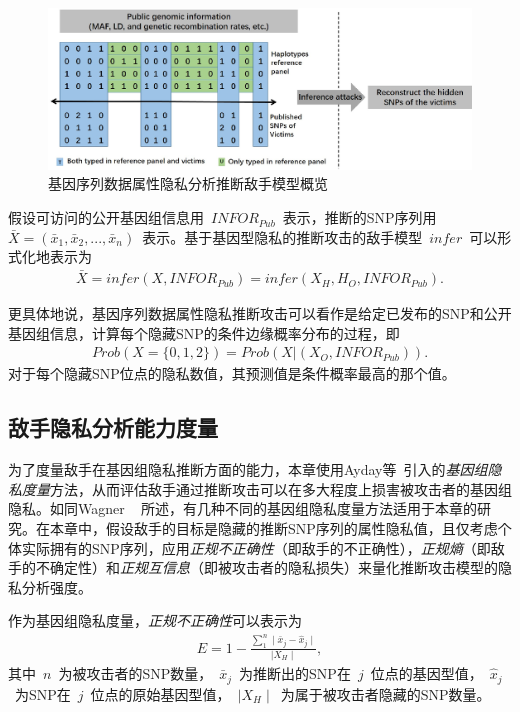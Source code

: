 \begin{figure}[htbp]
	\centering
	\includegraphics[width = 0.95\linewidth]{./figures/Fig2-adversary-model.eps}
	\caption{基因序列数据属性隐私分析推断敌手模型概览}
	\label{fig:adversary-model}
\end{figure}

假设可访问的公开基因组信息用~${INFOR}_{Pub}$~表示，推断的SNP序列用~$\bar{X}=(\bar{x}_1, \bar{x}_2,...,\bar{x}_n)$~表示。基于基因型隐私的推断攻击的敌手模型~$infer$~可以形式化地表示为
\begin{align}\label{eq:adversary-model}
\bar{X} = infer(X,{INFOR}_{Pub})  
=  infer(X_H,H_O,{INFOR}_{Pub}).
\end{align}

更具体地说，基因序列数据属性隐私推断攻击可以看作是给定已发布的SNP和公开基因组信息，计算每个隐藏SNP的条件边缘概率分布的过程，即
\begin{align}\label{eq:adversary-model-prob}
Prob(X=\{0,1,2\})=Prob(X|(X_O,{INFOR}_{Pub})).
\end{align}
对于每个隐藏SNP位点的隐私数值，其预测值是条件概率最高的那个值。

\subsection{敌手隐私分析能力度量}


为了度量敌手在基因组隐私推断方面的能力，本章使用Ayday等~\cite{ayday2013personal}引入的\textit{基因组隐私度量}方法，从而评估敌手通过推断攻击可以在多大程度上损害被攻击者的基因组隐私。如同Wagner
~\cite{wagner2017evaluating}
所述，有几种不同的基因组隐私度量方法适用于本章的研究。在本章中，假设敌手的目标是隐藏的推断SNP序列的属性隐私值，且仅考虑个体实际拥有的SNP序列，应用\textit{正规不正确性}（即敌手的不正确性），\textit{正规熵}（即敌手的不确定性）和\textit{正规互信息}（即被攻击者的隐私损失）来量化推断攻击模型的隐私分析强度。

作为基因组隐私度量，\textit{正规不正确性}可以表示为
\begin{align}\label{eq:metric-correctness}
E=1- \frac{\sum_1^n \mid \bar{x}_j - \hat{x}_j \mid}  {\mid X_H \mid},
\end{align}
其中~$n$~为被攻击者的SNP数量，~$\bar{x}_j$~为推断出的SNP在~$j$~位点的基因型值，~$\hat{x}_j$~为SNP在~$j$~位点的原始基因型值，~$\mid X_H \mid$~为属于被攻击者隐藏的SNP数量。

